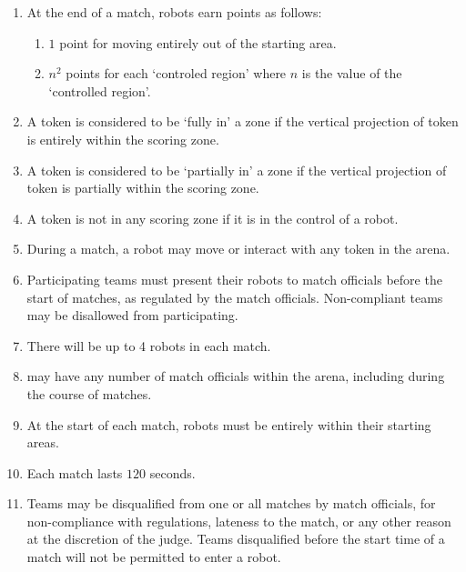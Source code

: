 \begin{enumerate}
  \item At the end of a match, robots earn points as follows:
    \begin{enumerate}
      \item $1$ point for moving entirely out of the starting area.
      \item $n^2$ points for each `controled region' where $n$ is the value of the `controlled region'. 
    \end{enumerate}
  \item A token is considered to be `fully in' a zone if the vertical projection of token
        is entirely within the scoring zone.
  \item A token is considered to be `partially in' a zone if the vertical projection of token
        is partially within the scoring zone.
  \item A token is not in any scoring zone if it is in the control of a robot.
  \item During a match, a robot may move or interact with any token in the arena.
  \item Participating teams must present their robots to match officials before
        the start of matches, as regulated by the match officials. Non-compliant
        teams may be disallowed from participating.
  \item There will be up to 4 robots in each match.
  \item \org may have any number of match officials within the arena, including
        during the course of matches.
  \item At the start of each match, robots must be entirely within their
        starting areas.
  \item Each match lasts $120$ seconds.
  \item Teams may be disqualified from one or all matches by match officials,
        for non-compliance with regulations, lateness to the match, or any other
        reason at the discretion of the judge. Teams disqualified before the
        start time of a match will not be permitted to enter a robot.
\end{enumerate}
